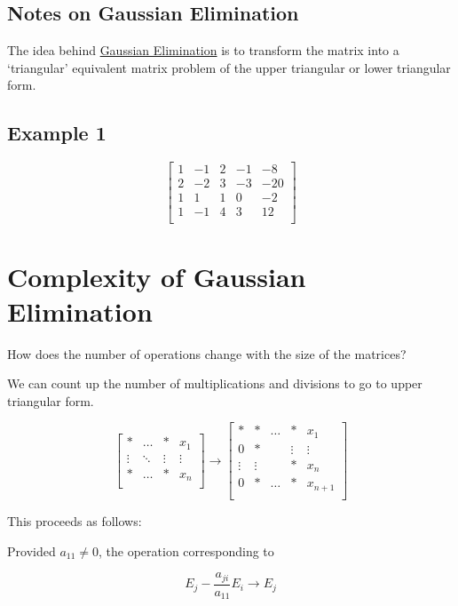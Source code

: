 \subsection{Notes on Gaussian Elimination}

The idea behind \uline{Gaussian Elimination} is to transform the matrix into
a \enquote*{triangular} equivalent matrix problem of the upper triangular
or lower triangular form.

\subsection{Example 1}

\begin{equation*}
  \begin{bmatrix}
  1 & -1 & 2 & -1 & -8\\
  2 & -2 & 3 & -3 & -20\\
  1 & 1 & 1 & 0 & -2\\
  1 & -1 & 4 & 3 & 12\\
  \end{bmatrix}
\end{equation*}

\section{Complexity of Gaussian Elimination}

How does the number of operations change with the size of the matrices?

We can count up the number of multiplications and divisions to go to upper
triangular form.

\begin{equation*}
  \begin{bmatrix}
  * & \dots & * & x_1\\
  \vdots & \ddots & \vdots & \vdots\\
  * & \dots & * & x_n\\
  \end{bmatrix} 
  \to
  \begin{bmatrix}
   * & * & \dots & * & x_1\\
   0 & * &  & \vdots &  \vdots \\
   \vdots & \vdots & & * & x_n \\
   0 & * & \dots & * & x_{n+1} \\
  \end{bmatrix}
\end{equation*}

This proceeds as follows:

Provided $a_{11} \ne 0$, the operation corresponding to 

\begin{equation*}
  E_j - \frac{a_{ji}}{a_{11}} E_i \to E_j
\end{equation*}

